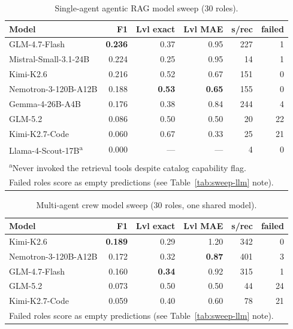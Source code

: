 \documentclass[conference]{IEEEtran}
\begin{document}
\begin{table}
\centering
\caption{Single-agent agentic RAG model sweep (30 roles).}
\label{tab:sweep-single}
\footnotesize
\setlength{\tabcolsep}{3.5pt}
\begin{tabularx}{\linewidth}{Xrrrrr}
\toprule
\textbf{Model} & \textbf{F1} & \textbf{Lvl exact} & \textbf{Lvl MAE} & \textbf{s/rec} & \textbf{failed}\\
\midrule
GLM-4.7-Flash & \textbf{0.236} & 0.37 & 0.95 & 227 & 1\\
Mistral-Small-3.1-24B & 0.224 & 0.25 & 0.95 & 14 & 1\\
Kimi-K2.6 & 0.216 & 0.52 & 0.67 & 151 & 0\\
Nemotron-3-120B-A12B & 0.188 & \textbf{0.53} & \textbf{0.65} & 155 & 0\\
Gemma-4-26B-A4B & 0.176 & 0.38 & 0.84 & 244 & 4\\
GLM-5.2 & 0.086 & 0.50 & 0.50 & 20 & 22\\
Kimi-K2.7-Code & 0.060 & 0.67 & 0.33 & 25 & 21\\
Llama-4-Scout-17B\textsuperscript{a} & 0.000 & --- & --- & 4 & 0\\
\bottomrule
\multicolumn{6}{l}{\footnotesize\textsuperscript{a}Never invoked the retrieval tools despite catalog capability flag.}\\
\multicolumn{6}{l}{\footnotesize Failed roles score as empty predictions (see Table~\ref{tab:sweep-llm} note).}\\
\end{tabularx}
\end{table}

\begin{table}
\centering
\caption{Multi-agent crew model sweep (30 roles, one shared model).}
\label{tab:sweep-crew}
\footnotesize
\setlength{\tabcolsep}{3.5pt}
\begin{tabularx}{\linewidth}{Xrrrrr}
\toprule
\textbf{Model} & \textbf{F1} & \textbf{Lvl exact} & \textbf{Lvl MAE} & \textbf{s/rec} & \textbf{failed}\\
\midrule
Kimi-K2.6 & \textbf{0.189} & 0.29 & 1.20 & 342 & 0\\
Nemotron-3-120B-A12B & 0.172 & 0.32 & \textbf{0.87} & 401 & 3\\
GLM-4.7-Flash & 0.160 & \textbf{0.34} & 0.92 & 315 & 1\\
GLM-5.2 & 0.073 & 0.50 & 0.50 & 44 & 24\\
Kimi-K2.7-Code & 0.059 & 0.40 & 0.60 & 78 & 21\\
\bottomrule
\multicolumn{6}{l}{\footnotesize Failed roles score as empty predictions (see Table~\ref{tab:sweep-llm} note).}\\
\end{tabularx}
\end{table}
\end{document}
